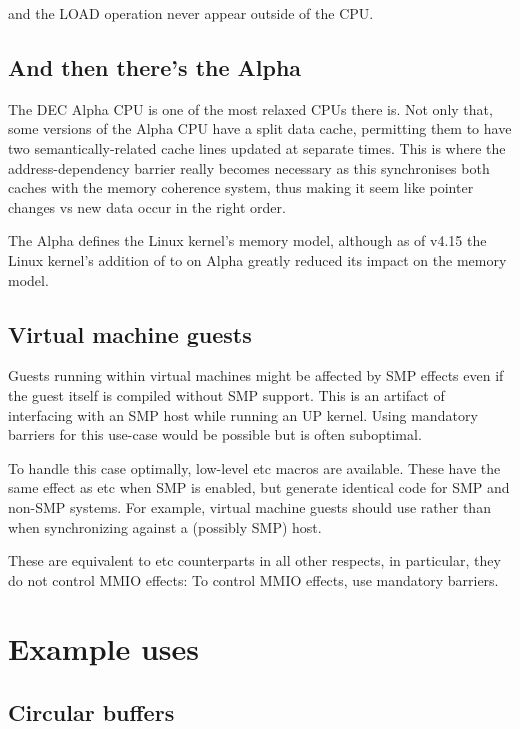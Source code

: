 \noindent%
and the LOAD operation never appear outside of the CPU.


\subsection{And then there's the Alpha}

The DEC Alpha CPU is one of the most relaxed CPUs there is.
Not only that, some versions of the Alpha CPU have a split data cache,
permitting them to have two semantically-related cache lines updated at
separate times.
This is where the address-dependency barrier really becomes necessary as
this synchronises both caches with the memory coherence system, thus making
it seem like pointer changes vs new data occur in the right order.

The Alpha defines the Linux kernel's memory model, although as of v4.15
the Linux kernel's addition of  to  on Alpha
greatly reduced its impact on the memory model.


\subsection{Virtual machine guests}
\label{sec:Virtual machine guests}

Guests running within virtual machines might be affected by SMP effects even if
the guest itself is compiled without SMP support.
This is an artifact of interfacing with an SMP host while running an UP kernel.
Using mandatory barriers for this use-case would be possible but is often
suboptimal.

To handle this case optimally, low-level  etc macros are
available.
These have the same effect as  etc when SMP is enabled, but
generate identical code for SMP and non-SMP systems.
For example, virtual machine guests should use  rather than
 when synchronizing against a (possibly SMP) host.

These are equivalent to  etc counterparts in all other respects,
in particular, they do not control MMIO effects:
To control MMIO effects, use mandatory barriers.


\section{Example uses}

\subsection{Circular buffers}

